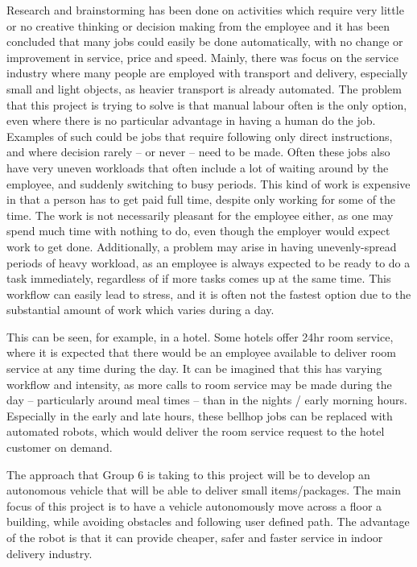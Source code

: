 \documentclass[11pt]{article}
\begin{document}
Research and brainstorming has been done on activities which require very little or no creative thinking or decision making from the employee and it has been concluded that many jobs could easily be done automatically, with no change or improvement in service, price and speed.  Mainly, there was focus on the service industry where many people are employed with transport and delivery, especially small and light objects, as heavier transport is already automated. The problem that this project is trying to solve is that manual labour often is the only option, even where there is no particular advantage in having a human do the job. Examples of such could be jobs that require following only direct instructions, and where decision rarely – or never – need to be made. Often these jobs also have very uneven workloads that often include a lot of waiting around by the employee, and suddenly switching to busy periods.  This kind of work is expensive in that a person has to get paid full time, despite only working for some of the time. The work is not necessarily pleasant for the employee either, as one may spend much time with nothing to do, even though the employer would expect work to get done. Additionally, a problem may arise in having unevenly-spread periods of heavy workload, as an employee is always expected to be ready to do a task immediately, regardless of if more tasks comes up at the same time. This workflow can easily lead to stress, and it is often not the fastest option due to the substantial amount of work which varies during a day.


This can be seen, for example, in a hotel. Some hotels offer 24hr room service, where it is expected that there would be an employee available to deliver room service at any time during the day. It can be imagined that this has varying workflow and intensity, as more calls to room service may be made during the day – particularly around meal times – than in the nights / early morning hours. Especially in the early and late hours, these bellhop jobs can be replaced with automated robots, which would deliver the room service request to the hotel customer on demand.


The approach that Group 6 is taking to this project will be to develop an autonomous vehicle that will be able to deliver small items/packages. The main focus of this project is to have a vehicle autonomously move across a floor a building, while avoiding obstacles and following user defined path.  The advantage of the robot is that it can provide cheaper, safer and faster service in indoor delivery industry.
\end{document}
